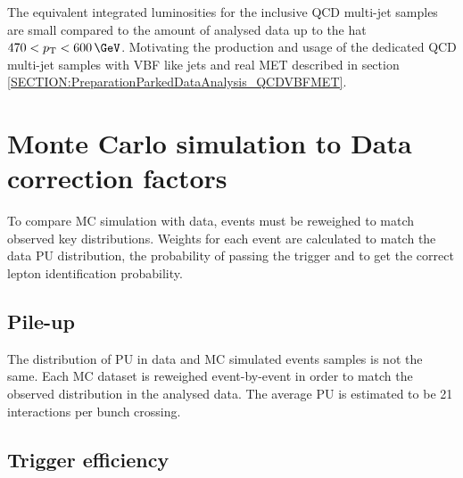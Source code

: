 The equivalent integrated luminosities for the inclusive \gls{QCD} multi-jet samples are small compared to the amount of analysed data up to the \pt hat $470<\pt<600\,\GeV$. Motivating the production and usage of the dedicated \gls{QCD} multi-jet samples with \gls{VBF} like jets and real \gls{MET} described in section \ref{SECTION:PreparationParkedDataAnalysis_QCDVBFMET}.

\clearpage

\section{Monte Carlo simulation to Data correction factors}


To compare \gls{MC} simulation with data, events must be reweighed to match observed key distributions. Weights for each event are calculated to match the data \gls{PU} distribution, the probability of passing the trigger and to get the correct lepton identification probability.

\subsection{Pile-up}


The distribution of \gls{PU} in data and \gls{MC} simulated events samples is not the same. Each \gls{MC} dataset is reweighed event-by-event in order to match the observed distribution in the analysed data. The average \gls{PU} is estimated to be 21 interactions per bunch crossing. 

\subsection{Trigger efficiency}
\label{SUBSECTION:ParkedDataAnalysis_CorrectionFactors_TriggerEfficiency}

